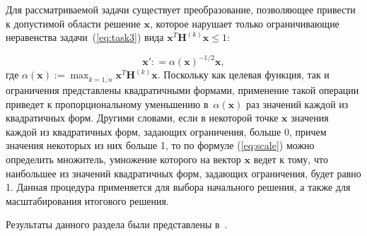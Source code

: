 Для рассматриваемой задачи существует преобразование, позволяющее привести к допустимой области решение $\textbf{x}$, которое нарушает только ограничивающие неравенства задачи~(\ref{eq:task3}) вида $\textbf{x}^{T}\textbf{H}^{(k)}\textbf{x} \leq 1$:

\begin{equation}
    \textbf{x}': =\alpha(\textbf{x})^{-1/2} \textbf{x} ,
    \label{eq:scale}
\end{equation}
где $\alpha(\textbf{x}):=\max_{k=\overline{1,n}} \textbf{x}^T \textbf{H}^{(k)}\textbf{x}$. Поскольку как целевая функция, так и ограничения представлены квадратичными формами, применение такой операции приведет к пропорциональному уменьшению в~$\alpha(\textbf{x})$ раз значений каждой из квадратичных форм. Другими словами, если в некоторой точке $\textbf{x}$ значения каждой из квадратичных форм, задающих ограничения, больше 0, причем значения некоторых из них больше 1, то по формуле (\ref{eq:scale}) можно определить множитель, умножение которого на вектор $\textbf{x}$ ведет к тому, что наибольшее из значений квадратичных форм, задающих ограничения, будет равно 1. Данная процедура применяется для выбора начального решения, а также для масштабирования итогового решения.

Результаты данного раздела были представлены в~\cite{tyu:opta,tyu:daor,tyu:fmh}. 